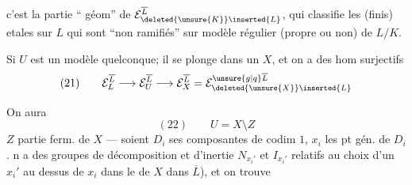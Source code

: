 
c'est la partie `` géom'' de $\mathcal E_{\deleted{\unsure{K}}\inserted{L}}^{\overline L}$,    qui classifie les  (finis) etales sur $L$ qui sont ``non ramifiés'' sur \uline{} modèle  régulier (propre ou non) de $L/K$.


Si $U$ est un modèle quelconque; il se plonge dans un $X$, et on a des hom surjectifs
\[
(21)\qquad \mathcal E_L^{\overline L}\longrightarrow\mathcal E_U^{\overline L}\longrightarrow\mathcal E_X^{\overline L}=\mathcal E_{\deleted{\unsure{X}}\inserted{L}}^{\unsure{g|q}\overline L}
\]

On aura 
\[
(22)\qquad U=X\setminus Z
\]
$Z$ partie ferm. de $X$ --- soient $D_i$ ses composantes de codim $1$, $x_i$ les pt gén. de $D_i$. n a des groupes de décomposition et d'inertie $N_{x_i'}$ et $I_{x_i'}$   relatifs au choix d'un $x_i'$ au dessus de $x_i$ dans le  de $X$ dans $\overline L$), et on trouve


